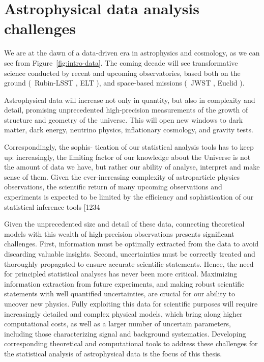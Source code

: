 \section{Astrophysical data analysis challenges}\label{sec:astro}

We are at the dawn of a data-driven era in astrophysics and cosmology, as we can see from Figure~\ref{fig:intro-data}. The coming decade will see transformative science conducted by recent and upcoming observatories, based both on the ground (\eg\ Rubin-LSST \cite{LSSTDarkEnergyScience:2012kar}, ELT \cite{Simon:2019aa}), and space-based missions (\eg\ JWST \citep{Gardner:2006ky}, Euclid \cite{Refregier:2010ss}). 


Astrophysical data will increase not only in quantity, but also in complexity and detail, promising unprecedented high-precision measurements of the growth of structure and geometry of the universe. This will open new windows to dark matter, dark energy, neutrino physics, inflationary cosmology, and gravity tests. 

Correspondingly, the sophis- tication of our statistical analysis tools has to keep up: increasingly, the limiting factor of our knowledge about the Universe is not the amount of data we have, but rather our ability of analyse, interpret and make sense of them.
Given the ever-increasing complexity of astroparticle physics observations, the scientific return of many upcoming observations and experiments is expected to be limited by the efficiency and sophistication of our statistical inference tools [1234



\cite{verde2010statistical, feigelson2021twenty, Trotta:2017wnx}

Given the unprecedented size and detail of these data, connecting theoretical models with this wealth of high-precision observations presents significant challenges. First, information must be optimally extracted from the data to avoid discarding valuable insights. Second, uncertainties must be correctly treated and thoroughly propagated to ensure accurate scientific statements. Hence, the need for principled statistical analyses has never been more critical. Maximizing information extraction from future experiments, and making robust scientific statements with well quantified uncertainties, are crucial for our ability to uncover new physics. Fully exploiting this data for scientific purposes will require increasingly detailed and complex physical models, which bring along higher computational costs, as well as a larger number of uncertain parameters, including those characterizing signal and background systematics. Developing corresponding theoretical and computational tools to address these challenges for the statistical analysis of astrophysical data is the focus of this thesis.

